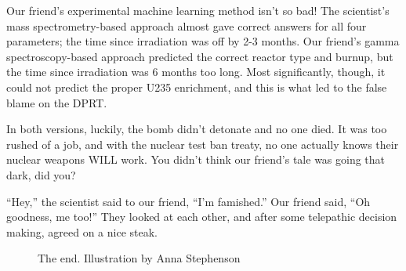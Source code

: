 {Our friend's experimental machine learning method isn't so bad! The scientist's
mass spectrometry-based approach almost gave correct answers for all four
parameters; the time since irradiation was off by 2-3 months.  Our friend's
gamma spectroscopy-based approach predicted the correct reactor type and
burnup, but the time since irradiation was 6 months too long. Most
significantly, though, it could not predict the proper \gls{U235} enrichment,
and this is what led to the false blame on the DPRT.  

In both versions, luckily, the bomb didn't detonate and no one died. It was too
rushed of a job, and with the nuclear test ban treaty, no one actually knows
their nuclear weapons WILL work. You didn't think our friend's tale was going
that dark, did you?

\vspace{8mm}
\begin{shadequote}

  ``Hey,'' the scientist said to our friend, ``I'm famished.'' Our friend said, ``Oh
  goodness, me too!'' They looked at each other, and after some telepathic
  decision making, agreed on a nice steak.

\end{shadequote}

\begin{figure}[H]
  \centering
  \large The end. \small Illustration by Anna Stephenson \\~\\
\end{figure}

}
